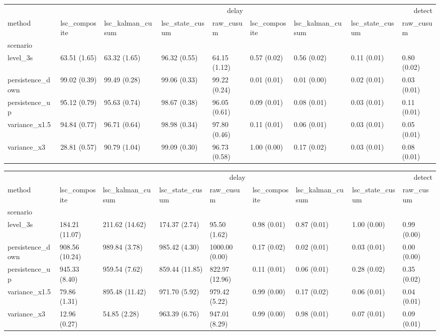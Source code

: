 \begin{tabular}{lllllllll}
\toprule
 & \multicolumn{4}{r}{delay} & \multicolumn{4}{r}{detect} \\
method & lsc_composite & lsc_kalman_cusum & lsc_state_cusum & raw_cusum & lsc_composite & lsc_kalman_cusum & lsc_state_cusum & raw_cusum \\
scenario &  &  &  &  &  &  &  &  \\
\midrule
level_3s & 63.51 (1.65) & 63.32 (1.65) & 96.32 (0.55) & 64.15 (1.12) & 0.57 (0.02) & 0.56 (0.02) & 0.11 (0.01) & 0.80 (0.02) \\
persistence_down & 99.02 (0.39) & 99.49 (0.28) & 99.06 (0.33) & 99.22 (0.24) & 0.01 (0.01) & 0.01 (0.00) & 0.02 (0.01) & 0.03 (0.01) \\
persistence_up & 95.12 (0.79) & 95.63 (0.74) & 98.67 (0.38) & 96.05 (0.61) & 0.09 (0.01) & 0.08 (0.01) & 0.03 (0.01) & 0.11 (0.01) \\
variance_x1.5 & 94.84 (0.77) & 96.71 (0.64) & 98.98 (0.34) & 97.80 (0.46) & 0.11 (0.01) & 0.06 (0.01) & 0.03 (0.01) & 0.05 (0.01) \\
variance_x3 & 28.81 (0.57) & 90.79 (1.04) & 99.09 (0.30) & 96.73 (0.58) & 1.00 (0.00) & 0.17 (0.02) & 0.03 (0.01) & 0.08 (0.01) \\
\bottomrule
\end{tabular}

\begin{tabular}{lllllllll}
\toprule
 & \multicolumn{4}{r}{delay} & \multicolumn{4}{r}{detect} \\
method & lsc_composite & lsc_kalman_cusum & lsc_state_cusum & raw_cusum & lsc_composite & lsc_kalman_cusum & lsc_state_cusum & raw_cusum \\
scenario &  &  &  &  &  &  &  &  \\
\midrule
level_3s & 184.21 (11.07) & 211.62 (14.62) & 174.37 (2.74) & 95.50 (1.62) & 0.98 (0.01) & 0.87 (0.01) & 1.00 (0.00) & 0.99 (0.00) \\
persistence_down & 908.56 (10.24) & 989.84 (3.78) & 985.42 (4.30) & 1000.00 (0.00) & 0.17 (0.02) & 0.02 (0.01) & 0.03 (0.01) & 0.00 (0.00) \\
persistence_up & 945.33 (8.40) & 959.54 (7.62) & 859.44 (11.85) & 822.97 (12.96) & 0.11 (0.01) & 0.06 (0.01) & 0.28 (0.02) & 0.35 (0.02) \\
variance_x1.5 & 79.86 (1.31) & 895.48 (11.42) & 971.70 (5.92) & 979.42 (5.22) & 0.99 (0.00) & 0.17 (0.02) & 0.06 (0.01) & 0.04 (0.01) \\
variance_x3 & 12.96 (0.27) & 54.85 (2.28) & 963.39 (6.76) & 947.01 (8.29) & 0.99 (0.00) & 0.98 (0.01) & 0.07 (0.01) & 0.09 (0.01) \\
\bottomrule
\end{tabular}
